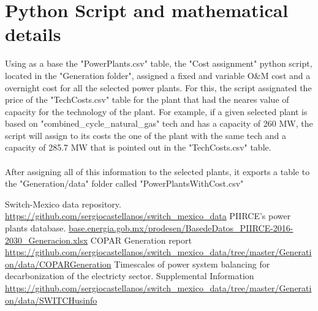 \documentclass[letterpaper,12pt]{article}
\begin{document}
\section{Python Script and mathematical details}
Using as a base the "PowerPlants.csv" table, the "Cost assignment" python script, located in the "Generation folder", assigned a fixed and variable O\&M cost and a overnight cost for all the selected power plants. For this, the script assignated the price of the "TechCosts.csv" table for the plant that had the neares value of capacity for the technology of the plant. For example, if a given selected plant is based on "combined\_cycle\_natural\_gas" tech and has a capacity of 260 MW, the script will assign to its costs the one of the plant with the same tech and a capacity of 285.7 MW that is pointed out in the "TechCosts.csv" table. 
\\
\\After assigning all of this information to the selected plants, it exports a table to the "Generation/data" folder called "PowerPlantsWithCost.csv"
\begin{thebibliography}{9}
 Switch-Mexico data repository. \url{https://github.com/sergiocastellanos/switch_mexico_data}
PIIRCE's power plants database. \url{base.energia.gob.mx/prodesen/BasedeDatos_PIIRCE-2016-2030_Generacion.xlsx}
 COPAR Generation report \url{https://github.com/sergiocastellanos/switch_mexico_data/tree/master/Generation/data/COPARGeneration}
Timescales of power system balancing for decarbonization of the electricty sector. Supplemental Information \url{https://github.com/sergiocastellanos/switch_mexico_data/tree/master/Generation/data/SWITCHusinfo}
\end{thebibliography}
\end{document}
